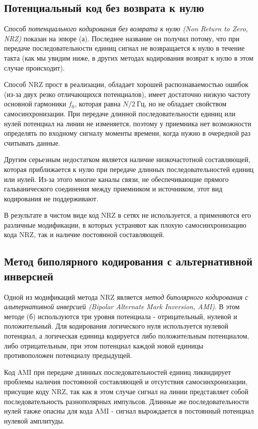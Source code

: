 \subsection{Потенциальный код без возврата  к нулю}

Способ \emph{потенциального кодирования без возврата к нулю (Non Return to Zero, NRZ)} показан на эпюре (а).
Последнее название он получил потому, что при передаче последовательности единиц сигнал не возвращается к нулю в течение такта (как мы увидим ниже, в других методах кодирования возврат к нулю в этом случае происходит).

Способ NRZ прост в реализации, обладает хорошей распознаваемостью ошибок (из-за двух резко отличающихся потенциалов), имеет достаточно низкую частоту основной гармоники $f_0$, которая равна $N/2~Гц$, но не обладает свойством самосинхронизации.
При передаче длинной последовательности единиц или нулей потенциал на линии не изменяется, поэтому у приемника нет возможности определять по входному сигналу моменты времени, когда нужно в очередной раз считывать данные.

Другим серьезным недостатком является наличие низкочастотной составляющей, которая приближается к нулю при передаче длинных последовательностей единиц или нулей.
Из-за этого многие каналы связи, не обеспечивающие прямого гальванического соединения между приемником и источником, этот вид кодирования не поддерживают.

В результате в чистом виде код NRZ в сетях не используется, а применяются его различные модификации, в которых устраняют как плохую самосинхронизацию кода NRZ, так и наличие постоянной составляющей.

\subsection{Метод биполярного кодирования с альтернативной инверсией}

Одной из модификаций метода NRZ является \emph{метод биполярного кодирования с альтернативной инверсией (Bipolar Alternate Mark Inversion, AMI)}.
В этом методе (б) используются три уровня потенциала - отрицательный, нулевой и положительный.
Для кодирования логического нуля используется нулевой потенциал, а логическая единица кодируется либо положительным потенциалом, либо отрицательным, при этом потенциал каждой новой единицы противоположен потенциалу предыдущей.

Код AMI при передаче длинных последовательностей единиц ликвидирует проблемы наличия постоянной составляющей и отсутствия самосинхронизации, присущие коду NRZ, так как в этом случае сигнал на линии представляет собой последовательность разнополярных импульсов.
Длинные же последовательности нулей также опасны для кода AMI - сигнал вырождается в постоянный потенциал нулевой амплитуды.

